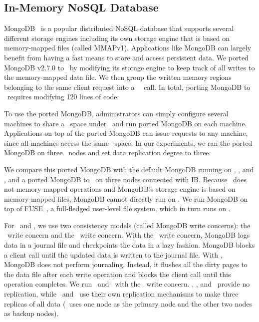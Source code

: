 \subsection{In-Memory NoSQL Database}
\label{sec:hotpot:mongodb}
MongoDB~\cite{MongoDB} is a popular distributed NoSQL database that supports several different storage engines
including its own storage engine that is based on memory-mapped files (called MMAPv1).
Applications like MongoDB can largely benefit from having a fast means to store and access persistent data. 
We ported MongoDB v2.7.0 to \hotpot\ by modifying its storage engine to keep track of all writes to the memory-mapped data file.
We then group the written memory regions belonging to the same client request into a \hotpot\ \commit\ call.
In total, porting MongoDB to \hotpot\ requires modifying 120 lines of code. 

To use the ported MongoDB, administrators can simply configure several machines to share 
a \dsnvm\ space under \hotpot\ and run ported MongoDB on each machine.
Applications on top of the ported MongoDB can issue requests to any machine, 
since all machines access the same \dsnvm\ space.
In our experiments, we ran the ported MongoDB on three \hotpot\ nodes
and set data replication degree to three.

We compare this ported MongoDB with the default MongoDB running on \tmpfs, \pmfs, and \Octopus, 
and a ported MongoDB to \Mojim\ on three nodes connected with IB.
Because \Octopus\ does not memory-mapped operations and MongoDB's storage engine is based on memory-mapped files,
MongoDB cannot directly run on \Octopus.
We run MongoDB on top of FUSE~\cite{fuse-fs}, a full-fledged user-level file system, 
which in turn runs on \Octopus.

For \tmpfs\ and \pmfs, we use two consistency models (called MongoDB write concerns):
the \journaled\ write concern and the \fsyncsafe\ write concern. With the \journaled\ write concern, MongoDB
logs data in a journal file and checkpoints the data in a lazy fashion. MongoDB blocks a client call until the
updated data is written to the journal file. With \fsyncsafe, MongoDB does not perform journaling. Instead, it flushes
all the dirty pages to the data file after each write operation and blocks the client call until this operation completes.
We run \Octopus\ and \Mojim\ with the \fsyncsafe\ write concern.
\Octopus, \tmpfs, and \pmfs\ provide no replication,
while \Mojim\ and \hotpot\ use their own replication mechanisms to make three replicas of all data 
(\Mojim\ uses one node as the primary node and the other two nodes as backup nodes).


